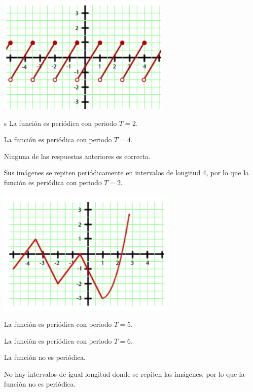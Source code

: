 \includegraphics{samples/propiedades/periodicidad2.jpg}
\begin{scq}
	\begin{choices}
		\begin{choice}[x]s
			La función es periódica con periodo $T=2$.	
		\end{choice}
		\begin{choice}
			La función es periódica con periodo $T=4$.
		\end{choice}	
		\begin{choice}
			Ninguna de las respuestas anteriores es correcta.
		\end{choice}
	\end{choices}
	\begin{feedback}
		Sus imágenes se repiten periódicamente en intervalos de longitud 4, por lo que la función es periódica con periodo $T=2$.
	\end{feedback}
\end{scq}

\vspace{1cm}

\includegraphics{samples/propiedades/periodicidad3.jpg}
\begin{scq}
	\begin{choices}
		\begin{choice}
			La función es periódica con periodo $T=5$.	
		\end{choice}
		\begin{choice}
			La función es periódica con periodo $T=6$.
		\end{choice}	
		\begin{choice}[x]
			La función no es periódica.
		\end{choice}
	\end{choices}
	\begin{feedback}
		No hay intervalos de igual longitud donde se repiten las imágenes, por lo que la función no es periódica.
	\end{feedback}
\end{scq}


